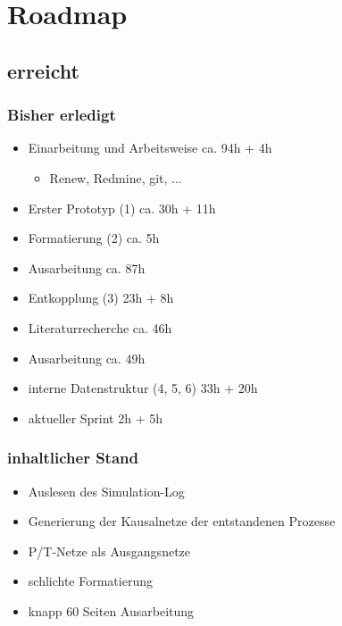 \section{Roadmap}

\subsection*{erreicht}
\begin{frame}
	\frametitle{Bisher erledigt}
	
	\begin{itemize}
		\item Einarbeitung und Arbeitsweise ca. 94h + 4h
		\begin{itemize}
			\item Renew, Redmine, git, ...
		\end{itemize}
		\item Erster Prototyp (1) ca. 30h + 11h
		\item Formatierung (2) ca. 5h
		\item Ausarbeitung ca. 87h
		\item Entkopplung (3) 23h + 8h
		\item Literaturrecherche ca. 46h
		\item Ausarbeitung ca. 49h
		\item interne Datenstruktur (4, 5, 6) 33h + 20h
		\item aktueller Sprint 2h + 5h
	\end{itemize}
\end{frame}

\begin{frame}
	\frametitle{inhaltlicher Stand}
	
	\begin{itemize}
			\item Auslesen des Simulation-Log
			\item Generierung der Kausalnetze der entstandenen Prozesse
			\item P/T-Netze als Ausgangsnetze
			\item schlichte Formatierung
			\item knapp 60 Seiten Ausarbeitung
		
	\end{itemize}
\end{frame}

